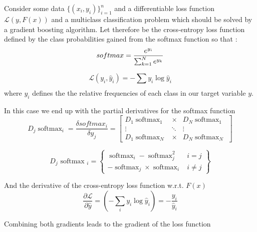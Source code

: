 \documentclass[12pt,a4paper,onecolumn,oneside,draft=on]{article}
\begin{document}
	
Consider some data  $\{(x_i,y_i)\}^n_{i=1}$ and a differentiable loss function $\mathcal{L}(y,F(x))$ and a multiclass classification problem which should be solved by a gradient boosting algorithm.
Let therefore be the cross-entropy loss function defined by the class probabilities gained from the softmax function so that :
\begin{equation}
softmax = \dfrac{e^{y_i}}{\sum_{k=1}^N e^{y_k}} \\
\label{eq:softmax:loss}
\end{equation}

\begin{equation}
\mathcal{L}(y_i,\hat{y}_i) = -\sum_{} y_i \log \hat{y}_i
\end{equation}
where $y_i$ defines the the relative frequencies of each class in our target variable $y$.



In this case we end up with the partial derivatives for the softmax function
\begin{equation}
D_j\operatorname{softmax}_i = \dfrac{\delta softmax_i}{\delta y_j} = \left[\begin{array}{rll}
D_{1} \operatorname{softmax}_{1} & \times & D_{N} \operatorname{softmax}_{1} \\
\vdots & \ddots & \vdots \\
D_{1} \operatorname{softmax}_{N} & \times & D_{N} \operatorname{softmax}_{N}
\end{array}\right]
\label{eq:dsoftmax}
\end{equation}

\begin{equation}
D_{j} \text { softmax }_{i}=\left\{\begin{array}{cc}
\operatorname{softmax}_{i}-\operatorname{softmax}_{j}^2 & i=j \\
-\operatorname{softmax}_{j} \times \operatorname{softmax}_{i} & i \neq j
\end{array}\right\}
\end{equation}

And the derivative of the cross-entropy loss function w.r.t. $F(x)$
\begin{equation}
\frac{\partial \mathcal{L}}{\partial \hat{y}}=\left(-\sum_{i} y_{i} \log \hat{y}_{i}\right)=-\frac{y_{i}}{\hat{y}_{i}}
\end{equation}

Combining both gradients leads to the gradient of the loss function
\end{document}
